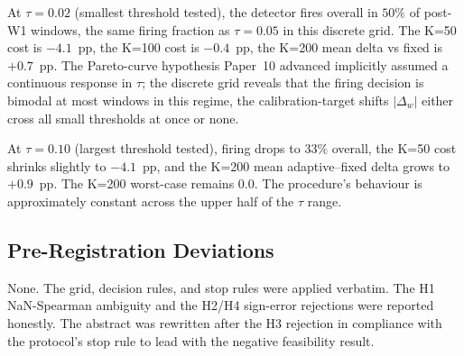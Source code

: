 At $\tau = 0.02$ (smallest threshold tested), the detector fires
overall in $50\%$ of post-W1 windows, the same firing fraction as
$\tau = 0.05$ in this discrete grid. The K=50 cost is
$-4.1$~pp, the K=100 cost is $-0.4$~pp, the K=200 mean delta vs
fixed is $+0.7$~pp. The Pareto-curve hypothesis Paper~10 advanced
implicitly assumed a continuous response in $\tau$; the discrete
grid reveals that the firing decision is bimodal at most windows
in this regime, the calibration-target shifts $|\Delta_w|$
either cross all small thresholds at once or none.

At $\tau = 0.10$ (largest threshold tested), firing drops to $33\%$
overall, the K=50 cost shrinks slightly to $-4.1$~pp, and the K=200
mean adaptive--fixed delta grows to $+0.9$~pp. The K=200 worst-case
remains $0.0$. The procedure's behaviour is approximately constant
across the upper half of the $\tau$ range.

\subsection{Pre-Registration Deviations}

None. The grid, decision rules, and stop rules were applied verbatim.
The H1 NaN-Spearman ambiguity and the H2/H4 sign-error rejections
were reported honestly. The abstract was rewritten after the H3
rejection in compliance with the protocol's stop rule to lead with
the negative feasibility result.
